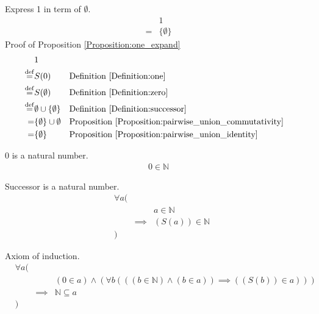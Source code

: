 \begin{prop}
\label{Proposition:one_expand}
Express 1 in term of $\emptyset$.
\begin{align*}
& 1 \\
= & \{ \emptyset \}
\end{align*}
Proof of Proposition \ref{Proposition:one_expand}
\begin{align*}
& 1 \\
\overset{\operatorname{def}}{=} & S(0)
& & \text{Definition \ref{Definition:one}} \\
\overset{\operatorname{def}}{=} & S(\emptyset)
& & \text{Definition \ref{Definition:zero}} \\
\overset{\operatorname{def}}{=} & \emptyset \cup \{ \emptyset \}
& & \text{Definition \ref{Definition:successor}} \\
= & \{ \emptyset \} \cup \emptyset
& & \text{Proposition \ref{Proposition:pairwise_union_commutativity}} \\
= & \{ \emptyset \}
& & \text{Proposition \ref{Proposition:pairwise_union_identity}} \\
\end{align*}
\end{prop}

\begin{axm}
\label{Axiom:zero_is_natural_number}
0 is a natural number.
\begin{align*}
0 \in \mathbb{N}
\end{align*}
\end{axm}

\begin{axm}
\label{Axiom:successor_is_natural_number}
Successor is a natural number.
\begin{align*}
& \forall a ( \\
& & & a \in \mathbb{N} \\
& & \implies & (S(a)) \in \mathbb{N} \\
& )
\end{align*}
\end{axm}

\begin{axm}
\label{Axiom:induction}
Axiom of induction.
\begin{align*}
& \forall a ( \\
& & & (0 \in a) \land (\forall b (((b \in \mathbb{N}) \land (b \in a)) \implies ((S(b)) \in a))) \\
& & \implies & \mathbb{N} \subseteq a \\
& )
\end{align*}
\end{axm}

